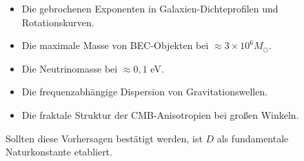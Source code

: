 \documentclass[11pt,a4paper]{article}
\begin{document}
\begin{itemize}
    \item Die gebrochenen Exponenten in Galaxien-Dichteprofilen und Rotationskurven.
    \item Die maximale Masse von BEC-Objekten bei \(\approx 3 \times 10^6 M_\odot\).
    \item Die Neutrinomasse bei \(\approx 0{,}1\) eV.
    \item Die frequenzabhängige Dispersion von Gravitationswellen.
    \item Die fraktale Struktur der CMB-Anisotropien bei großen Winkeln.
\end{itemize}

Sollten diese Vorhersagen bestätigt werden, ist \(D\) als fundamentale Naturkonstante etabliert.
\end{document}
